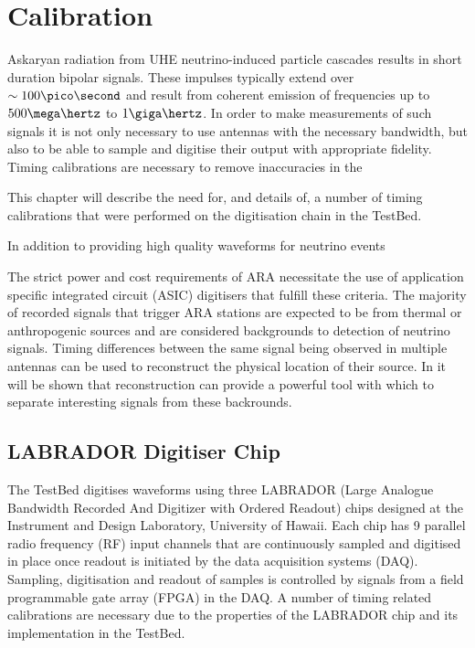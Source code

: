 \chapter{Calibration}
\label{chap:Calibration}













Askaryan radiation from UHE neutrino-induced particle cascades results in short duration bipolar signals. These impulses typically extend over $\sim 100 \pico \second$ and result from coherent emission of frequencies up to $500 \mega \hertz$ to $1 \giga \hertz$. In order to make measurements of such signals it is not only necessary to use antennas with the necessary bandwidth, but also to be able to sample and digitise their output with appropriate fidelity. Timing calibrations are necessary to remove inaccuracies in the 




This chapter will describe the need for, and details of, a number of timing calibrations that were performed on the digitisation chain in the TestBed.

In addition to providing high quality waveforms for neutrino events 




The strict power and cost requirements of ARA necessitate the use of application specific integrated circuit (ASIC) digitisers that fulfill these criteria. The majority of recorded signals that trigger ARA stations are expected to be from thermal or anthropogenic sources and are considered backgrounds to detection of neutrino signals. Timing differences between the same signal being observed in multiple antennas can be used to reconstruct the physical location of their source. In  it will be shown that reconstruction can provide a powerful tool with which to separate interesting signals from these backrounds. 


\section{LABRADOR Digitiser Chip}
\label{sec:calibration:LABRADOR-Digitiser-Chip}

The TestBed digitises waveforms using three LABRADOR (Large Analogue Bandwidth Recorded And Digitizer with Ordered Readout) chips designed at the Instrument and Design Laboratory, University of Hawaii. Each chip has 9 parallel radio frequency (RF) input channels that are continuously sampled and digitised in place once readout is initiated by the data acquisition systems (DAQ). Sampling, digitisation and readout of samples is controlled by signals from a field programmable gate array (FPGA) in the DAQ. A number of timing related calibrations are necessary due to the properties of the LABRADOR chip and its implementation in the TestBed. 

